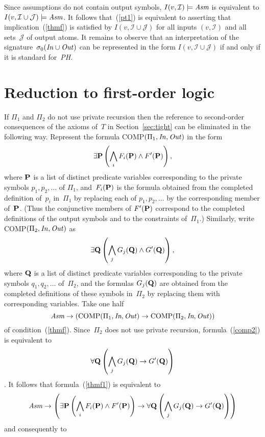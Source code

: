 \documentclass{new_tlp}
\def\beq{\begin{equation}}
\def\eeq#1{\label{#1}\end{equation}}
\newcommand{\I}{\mathcal{I}}
\newcommand{\J}{\mathcal{J}}
\begin{document}
Since assumptions do not contain output symbols,
$I(v,\I)\models\emph{Asm}$ is equivalent to $I(v,\I\cup\J)\models\emph{Asm}$.
It follows that~(\ref{pt1}) is equivalent to asserting that
implication~(\ref{thmf}) is satisfied by $I(v,\I\cup\J)$ for all
inputs $(v,\I)$ and all sets~$\J$ of output atoms.  It remains to observe
that an interpretation of the
signature~$\sigma_0(\emph{In\/}\cup\emph{Out\/})$ can be represented in
the form $I(v,\I\cup\J)$ if and only if it is
standard for~\emph{PH}.

\section{Reduction to first-order logic} \label{sec:elim}

If $\Pi_1$ and $\Pi_2$ do not use private recursion then
the reference to second-order consequences of the
axioms of~$T$ in Section~\ref{sec:tight} can be eliminated in the
following way.  Represent the formula
COMP$(\Pi_1,\emph{In\/},\emph{Out\/})$ in the form
$$
\exists {\bf P}\left(\bigwedge_i F_i({\bf P}) \land F'({\bf P})\right),
$$
where $\bf P$ is a list
of distinct predicate variables
corresponding to the
private symbols $p_1,p_2,\dots$
of $\Pi_1$, and~$F_i({\bf P})$ is
the formula obtained from the completed definition
of~$p_i$ in~$\Pi_1$ by replacing each of $p_1,p_2,\dots$ by the
corresponding member of~$\bf P$. (Thus the conjunctive members
of $F'({\bf P})$ correspond to the completed definitions of the output
symbols and to the constraints of~$\Pi_1$.)  Similarly, write
COMP$(\Pi_2,\emph{In\/},\emph{Out\/})$ as
\beq
\exists {\bf Q}\left(\bigwedge_j G_j({\bf Q}) \land G'({\bf Q})\right),
\eeq{comp2}
where $\bf Q$ is a list of distinct predicate variables corresponding to the
private symbols $q_1,q_2,\dots$ of~$\Pi_2$,
and the formulas $G_j({\bf Q})$ are obtained from the completed
definitions of these symbols in~$\Pi_2$ by replacing them with
corresponding variables.  Take one half
\beq
\emph{Asm}\to(\hbox{COMP}(\Pi_1,\emph{In},\emph{Out\/}) \to
\hbox{COMP}(\Pi_2,\emph{In},\emph{Out\/}))
\eeq{thmf1}
of condition~(\ref{thmf}).
Since~$\Pi_2$ does not use private
recursion, formula~(\ref{comp2}) is equivalent to
$$\forall {\bf Q}\left(\bigwedge_j G_j({\bf Q}) \to G'({\bf Q})\right)$$
\cite[Theorem~3]{fan20}.  It follows that formula~(\ref{thmf1}) is
equivalent to
$$
\emph{Asm}\to
 \left(\exists {\bf P}\left(\bigwedge_i F_i({\bf P}) \land F'({\bf P})\right)
 \to\forall {\bf Q}\left(\bigwedge_j G_j({\bf Q}) \to G'({\bf Q})\right)\right)
$$
and consequently to
\end{document}
